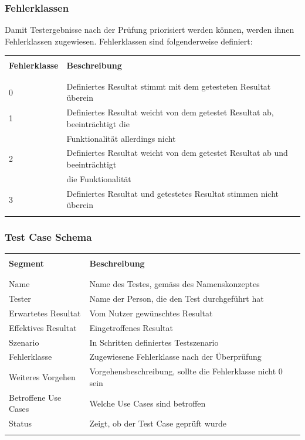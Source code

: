 \subsubsection{Fehlerklassen}
Damit Testergebnisse nach der Prüfung priorisiert werden können, werden ihnen Fehlerklassen zugewiesen.
\newline
Fehlerklassen sind folgenderweise definiert:
\begin{table}[htp]
  \begin{tabularx}{\textwidth}{l l X}\hline \\
  \textbf{Fehlerklasse} & \textbf{Beschreibung} \\ \\\hline \\
  0 & Definiertes Resultat stimmt mit dem getesteten Resultat überein \\
  1 & Definiertes Resultat weicht von dem getestet Resultat ab, beeinträchtigt die \\
    & Funktionalität allerdings nicht \\
  2 & Definiertes Resultat weicht von dem getestet Resultat ab und beeinträchtigt \\
    & die Funktionalität \\
  3 & Definiertes Resultat und getestetes Resultat stimmen nicht überein \\
  \\\hline
  \end{tabularx}
\end{table}
\pagebreak
\subsubsection{Test Case Schema}
\begin{table}[htp]
  \begin{tabularx}{\textwidth}{l l X}\hline \\
  \textbf{Segment} & \textbf{Beschreibung} \\ \\\hline \\
  Name & Name des Testes, gemäss des Namenskonzeptes \\
  Tester & Name der Person, die den Test durchgeführt hat \\
  Erwartetes Resultat & Vom Nutzer gewünschtes Resultat \\
  Effektives Resultat & Eingetroffenes Resultat \\
  Szenario & In Schritten definiertes Testszenario \\
  Fehlerklasse & Zugewiesene Fehlerklasse nach der Überprüfung \\
  Weiteres Vorgehen & Vorgehensbeschreibung, sollte die Fehlerklasse nicht 0 sein \\
  Betroffene Use Cases & Welche Use Cases sind betroffen \\
  Status & Zeigt, ob der Test Case geprüft wurde \\
  \\\hline
  \end{tabularx}
\end{table}
